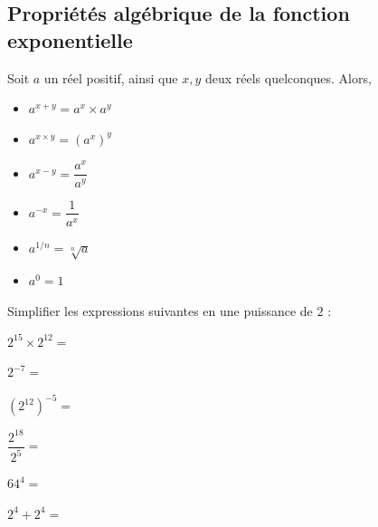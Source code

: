 \documentclass{poly}
\begin{document}
\subsection{Propriétés algébrique de la fonction exponentielle}
\begin{proposition}
Soit $a$ un réel positif, ainsi que $x,y$ deux réels quelconques. Alors,
\begin{itemize}
\item $a^{x+y}=a^x \times a^y$
\item $a^{x \times y} = (a^x)^y$
\item $a^{x - y} = \dfrac{a^x}{a^y}$
\item $a^{-x} = \dfrac{1}{a^x}$
\item $a^{1/n} = \sqrt[n]{a}$
\item $a^0 = 1$
\end{itemize}
\end{proposition}
\begin{example}
Simplifier les expressions suivantes en une puissance de $2$ :
\begin{alphaquestions}
\begin{minipage}{0.45\textwidth}
\item $2^{15} \times 2^{12} = $ 
\item $2^{-7} =$  
\item $(2^{12})^{-5} =$ 
\end{minipage}
\hfill
\begin{minipage}{0.45\textwidth}
\item $\dfrac{2^{18}}{2^5} = $ 
\item $64^{4} =$  
\item $2^4 + 2^4 =$ 
\end{minipage}
\end{alphaquestions}
\end{example}
\end{document}
